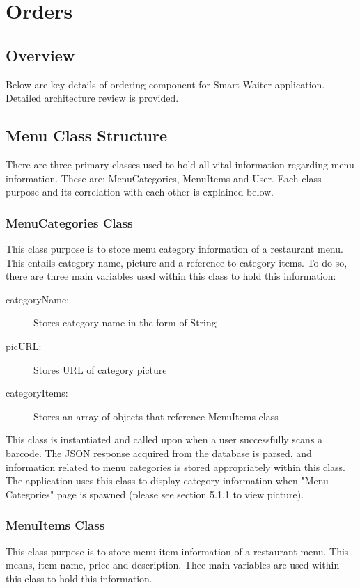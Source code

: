 \documentclass[12pt, titlepage]{article}
\begin{document}
\section{Orders}

\subsection{Overview}
Below are key details of ordering component for Smart Waiter application. Detailed architecture review is provided.

\subsection{Menu Class Structure}
There are three primary classes used to hold all vital information regarding menu information. These are: MenuCategories, MenuItems and User. Each class purpose and its correlation with each other is explained below.

\subsubsection{MenuCategories Class}
This class purpose is to store menu category information of a restaurant menu. This entails category name, picture and a reference to category items. To do so, there are three main variables used within this class to hold this information: 

\begin{description}
  \item[categoryName:] Stores category name in the form of String
  \item[picURL:] Stores URL of category picture
  \item[categoryItems:] Stores an array of objects that reference MenuItems class
\end{description}


This class is instantiated and called upon when a user successfully scans a barcode. The JSON response acquired from the database is parsed, and information related to menu categories is stored appropriately within this class. The application uses this class to display category information when "Menu Categories" page is spawned (please see section 5.1.1 to view picture).

\subsubsection{MenuItems Class}
This class purpose is to store menu item information of a restaurant menu. This means, item name, price and description. Thee main variables are used within this class to hold this information.
\end{document}
